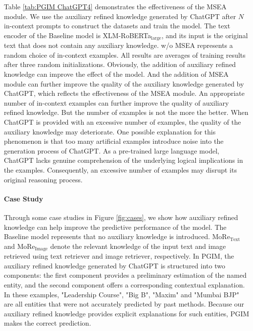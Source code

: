 \documentclass[11pt]{article}
\begin{document}
Table \ref{tab:PGIM ChatGPT4} demonstrates the effectiveness of the MSEA module. 
We use the auxiliary refined knowledge generated by ChatGPT after $N$ in-context prompts to construct the datasets and train the model. 
The text encoder of the Baseline model is XLM-RoBERTa$_\text{large}$, and its input is the original text that does not contain any auxiliary knowledge. 
w/o MSEA represents a random choice of in-context examples. All results are averages of training results after three random initializations. 
Obviously, the addition of auxiliary refined knowledge can improve the effect of the model. And the addition of MSEA module can further improve the quality of the auxiliary knowledge generated by ChatGPT, which reflects the effectiveness of the MSEA module. An appropriate number of in-context examples can further improve the quality of auxiliary refined knowledge. 
But the number of examples is not the more the better. When ChatGPT is provided with an excessive number of examples, the quality of the auxiliary knowledge may deteriorate. One possible explanation for this phenomenon is that too many artificial examples introduce noise into the generation process of ChatGPT.
As a pre-trained large language model, ChatGPT lacks genuine comprehension of the underlying logical implications in the examples. Consequently, an excessive number of examples may disrupt its original reasoning process. 


\paragraph{Case Study}
Through some case studies in Figure \ref{fig:cases}, we show how auxiliary refined knowledge can help improve the predictive performance of the model. The Baseline model represents that no auxiliary knowledge is introduced. MoRe$_{\text{Text}}$ and MoRe$_{\text{Image}}$ denote the relevant knowledge of the input text and image retrieved using text retriever and image retriever, respectively. 
In PGIM, the auxiliary refined knowledge generated by ChatGPT is structured into two components: the first component provides a preliminary estimation of the named entity, and the second component offers a corresponding contextual explanation. 
In these examples, "Leadership Course", "Big B", "Maxim" and "Mumbai BJP" are all entities that were not accurately predicted by past methods. Because our auxiliary refined knowledge provides explicit explanations for such entities, PGIM makes the correct prediction.
\end{document}
